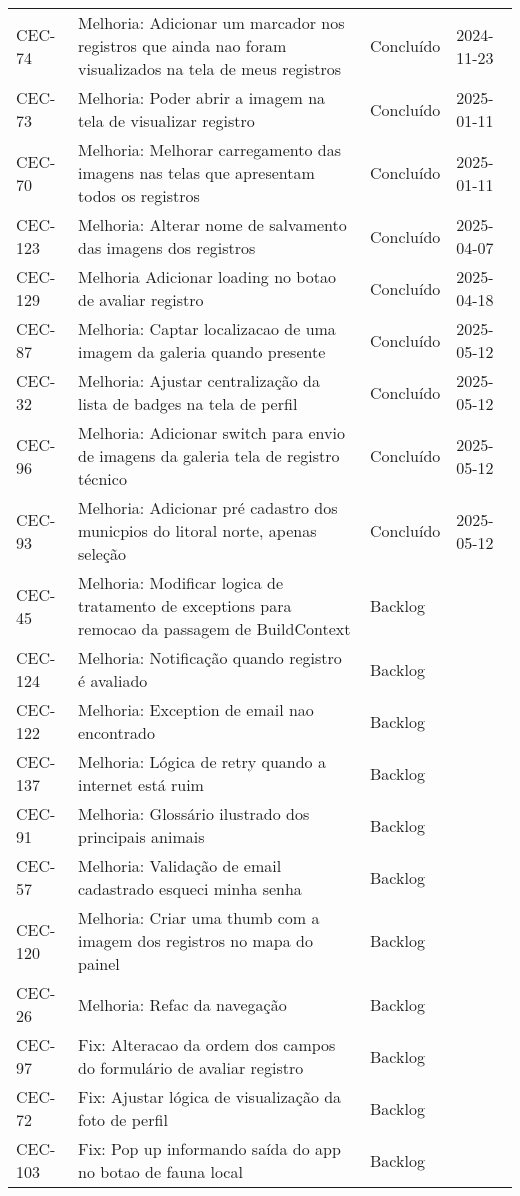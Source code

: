 \begin{longtable}{@{}lp{7cm}ll@{}}
\bottomrule
\endlastfoot
CEC-74 & Melhoria: Adicionar um marcador nos registros que ainda nao foram visualizados na tela de meus registros & Concluído & 2024-11-23\\
CEC-73 & Melhoria: Poder abrir a imagem na tela de visualizar registro & Concluído & 2025-01-11 \\
CEC-70 & Melhoria: Melhorar carregamento das imagens nas telas que apresentam todos os registros & Concluído & 2025-01-11 \\
CEC-123 & Melhoria: Alterar nome de salvamento das imagens dos registros & Concluído & 2025-04-07 \\
CEC-129 & Melhoria Adicionar loading no botao de avaliar registro & Concluído & 2025-04-18 \\
CEC-87 & Melhoria: Captar localizacao de uma imagem da galeria quando presente & Concluído & 2025-05-12 \\
CEC-32 & Melhoria: Ajustar centralização da lista de badges na tela de perfil & Concluído & 2025-05-12 \\
CEC-96 & Melhoria: Adicionar switch para envio de imagens da galeria tela de registro técnico & Concluído & 2025-05-12 \\
CEC-93 & Melhoria: Adicionar pré cadastro dos municpios do litoral norte, apenas seleção & Concluído & 2025-05-12 \\
CEC-45 & Melhoria: Modificar logica de tratamento de exceptions para remocao da passagem de BuildContext & Backlog &  \\
CEC-124 & Melhoria: Notificação quando registro é avaliado & Backlog & \\
CEC-122 & Melhoria: Exception de email nao encontrado & Backlog & \\
CEC-137 & Melhoria: Lógica de retry quando a internet está ruim & Backlog & \\
CEC-91 & Melhoria: Glossário ilustrado dos principais animais & Backlog & \\
CEC-57 & Melhoria: Validação de email cadastrado esqueci minha senha & Backlog & \\
CEC-120 & Melhoria: Criar uma thumb com a imagem dos registros no mapa do painel & Backlog & \\
CEC-26 & Melhoria: Refac da navegação & Backlog & \\
CEC-97 & Fix: Alteracao da ordem dos campos do formulário de avaliar registro & Backlog & \\
CEC-72 & Fix: Ajustar lógica de visualização da foto de perfil & Backlog & \\
CEC-103 & Fix: Pop up informando saída do app no botao de fauna local & Backlog & \\

\end{longtable}
